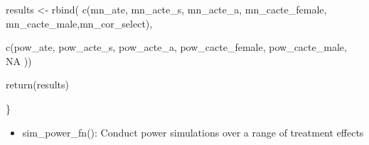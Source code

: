 \documentclass[
]{article}
\newenvironment{Shaded}{\begin{snugshade}}{\end{snugshade}}
\newcommand{\ConstantTok}[1]{\textcolor[rgb]{0.00,0.00,0.00}{#1}}
\newcommand{\FunctionTok}[1]{\textcolor[rgb]{0.00,0.00,0.00}{#1}}
\newcommand{\NormalTok}[1]{#1}
\newcommand{\OtherTok}[1]{\textcolor[rgb]{0.56,0.35,0.01}{#1}}
\providecommand{\tightlist}{%
  \setlength{\itemsep}{0pt}\setlength{\parskip}{0pt}}
\begin{document}
\begin{Shaded}
\begin{Highlighting}[]
  
\NormalTok{  results }\OtherTok{\textless{}{-}} \FunctionTok{rbind}\NormalTok{(}
    \FunctionTok{c}\NormalTok{(mn\_ate,}
\NormalTok{      mn\_acte\_s,}
\NormalTok{      mn\_acte\_a,}
\NormalTok{      mn\_cacte\_female,}
\NormalTok{      mn\_cacte\_male,mn\_cor\_select),}
    
    \FunctionTok{c}\NormalTok{(pow\_ate,}
\NormalTok{      pow\_acte\_s,}
\NormalTok{      pow\_acte\_a,}
\NormalTok{      pow\_cacte\_female,}
\NormalTok{      pow\_cacte\_male,}
      \ConstantTok{NA}
\NormalTok{    ))}
  
  \FunctionTok{return}\NormalTok{(results)}
  
\NormalTok{\}}
\end{Highlighting}
\end{Shaded}

\begin{itemize}
\tightlist
\item
  sim\_power\_fn(): Conduct power simulations over a range of treatment
  effects
\end{itemize}
\end{document}
